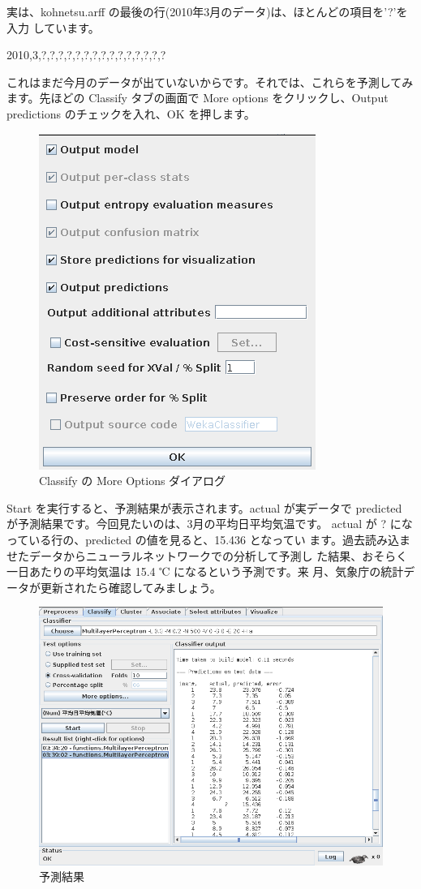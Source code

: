 \documentclass[mingoth,a4paper]{jsarticle}
\begin{document}
実は、kohnetsu.arff の最後の行(2010年3月のデータ)は、ほとんどの項目を'?'を入力
しています。

\begin{commandline}
2010,3,?,?,?,?,?,?,?,?,?,?,?,?,?,?,?
\end{commandline}

これはまだ今月のデータが出ていないからです。それでは、これらを予測してみ
ます。先ほどの Classify タブの画面で More options をクリックし、Output
predictions のチェックを入れ、OK を押します。

\begin{figure}[H]
\begin{center}
\caption{Classify の More Options ダイアログ}
\includegraphics[width=0.4\hsize]{image201003/weka8.png}
\end{center}
\end{figure}

Start を実行すると、予測結果が表示されます。actual が実データで
predicted が予測結果です。今回見たいのは、3月の平均日平均気温です。
actual が ? になっている行の、predicted の値を見ると、15.436 となってい
ます。過去読み込ませたデータからニューラルネットワークでの分析して予測し
た結果、おそらく一日あたりの平均気温は 15.4 ℃ になるという予測です。来
月、気象庁の統計データが更新されたら確認してみましょう。

\begin{figure}[H]
\begin{center}
\caption{予測結果}
\includegraphics[width=0.6\hsize]{image201003/weka9.png}
\end{center}
\end{figure}
\end{document}
